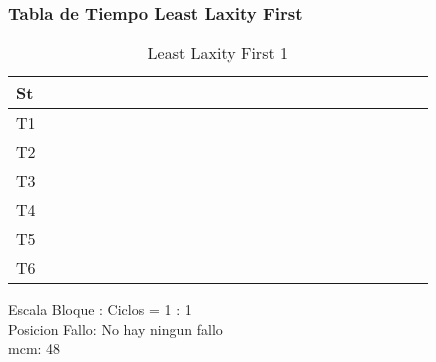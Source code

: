 \documentclass[xcolor=table]{beamer}
\begin{document}
\begin{frame} 
\frametitle{Tabla de Tiempo  Least Laxity First } 
\begin{table} 
\centering 
\begin{tabular}{|l|l|l|l|l|l|l|l|l|l|l|l|l|l|l|l|l|l|l|l|l|l|l|l|l|} 
\hline 
St & \cellcolor{green} & \cellcolor{green} & \cellcolor{green} & \cellcolor{green} & \cellcolor{green} & \cellcolor{green} & \cellcolor{green} & \cellcolor{green} & \cellcolor{green} & \cellcolor{green} & \cellcolor{green} & \cellcolor{green} & \cellcolor{green} & \cellcolor{green} & \cellcolor{green} & \cellcolor{green} & \cellcolor{green} & \cellcolor{green} & \cellcolor{green} & \cellcolor{green} & \cellcolor{green} & \cellcolor{green} & \cellcolor{green} & \cellcolor{green} \\ \hline 
T1 & & & & & & \cellcolor{blue} & & & & & & & & & & & & & & & & & & \\ \hline 
T2 & & & & & \cellcolor{purple} & & & & & & & & & & & & & & & & & & & \\ \hline 
T3 & & & & \cellcolor{cyan} & & & & & & & & & & & & & & & & & & & & \\ \hline 
T4 & & & \cellcolor{gray} & & & & & & & & & & & & & & & & & & & & & \\ \hline 
T5 & & \cellcolor{yellow} & & & & & & & & & & & & & & & & & & & & & & \\ \hline 
T6 & \cellcolor{orange} & & & & & & & & & & & & & & & & & & & & & & & \\ \hline 
\end{tabular} 
\caption{ Least Laxity First 1 } 
\end{table} 
Escala Bloque : Ciclos = 1 : 1 \\ 
Posicion Fallo: No hay ningun fallo \\ 
mcm:  48 \\ 
\end{frame} 

\end{document}
